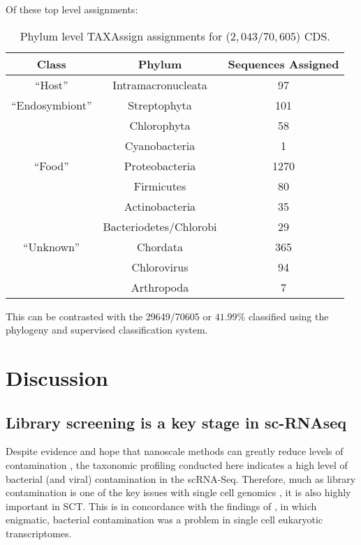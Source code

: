 Of these top level assignments:
\begin{table}
	\begin{tabular}{| c | c | c |}
\hline
\textbf{Class} & \textbf{Phylum} & \textbf{Sequences Assigned} \\
\hline
``Host'' & Intramacronucleata & 97 \\
``Endosymbiont'' & Streptophyta & 101 \\
				 & Chlorophyta & 58 \\
				 & Cyanobacteria & 1 \\
``Food'' & Proteobacteria & 1270 \\
	& Firmicutes & 80 \\
	& Actinobacteria & 35 \\
	& Bacteriodetes/Chlorobi & 29\\
``Unknown'' & Chordata & 365 \\

& Chlorovirus & 94 \\ 
			& Arthropoda & 7 \\
			\hline 
	\end{tabular}
	\caption{Phylum level TAXAssign assignments for (\(2,043/70,605\)) CDS.}
	\label{tab:taxassign}
\end{table}

This can be contrasted with the 29649/70605 or \(41.99\%\) classified 
using the phylogeny and supervised classification system.

\section{Discussion}

\subsection{Library screening is a key stage in sc-RNAseq}

Despite evidence and hope that nanoscale methods can greatly reduce levels of contamination \citep{Blainey2011}, 
the taxonomic profiling conducted here
indicates a high level of bacterial (and viral) contamination in the scRNA-Seq.  
Therefore, much as library contamination is one of the key issues with single cell genomics \citep{Blainey2013,Lusk2014}, it is also highly
important in SCT.  This is in concordance with the findings of \citep{Kolisko2014}, 
in which enigmatic, bacterial contamination was a problem in single cell eukaryotic
transcriptomes.   

